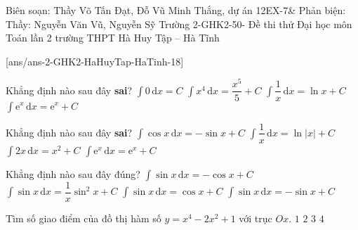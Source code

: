 
\begin{name}
{Biên soạn: Thầy Võ Tấn Đạt, Đỗ Vũ Minh Thắng, dự án 12EX-7\& Phản biện: Thầy: Nguyễn Văn Vũ, Nguyễn Sỹ Trường }
{2-GHK2-50- Đề thi thử Đại học môn Toán lần 2 trường THPT Hà Huy Tập – Hà Tĩnh}
\end{name}
\setcounter{ex}{0}\setcounter{bt}{0}
[ans/ans-2-GHK2-HaHuyTap-HaTinh-18]
\begin{ex}%
	Khẳng định nào sau đây \textbf{sai}?
	\choice
	{ $ \displaystyle\int0\mathrm{\,d}x = C $ }
	{ $ \displaystyle\int x^4\mathrm{\,d}x = \dfrac{x^5}{5} + C  $ }
	{\True $ \displaystyle\int\dfrac{1}{x}\mathrm{\,d}x = \ln x + C  $ }
	{ $ \displaystyle\int \mathrm{e}^x\mathrm{\,d}x = \mathrm{e}^x+C $ }
\end{ex}
\begin{ex}%
	Khẳng định nào sau đây \textbf{sai}?
	\choice
	{\True $ \displaystyle\int\cos x\mathrm{\,d}x = -\sin x + C $ }
	{ $ \displaystyle\int\dfrac{1}{x}\mathrm{\,d}x = \ln |x| + C $ }
	{ $ \displaystyle\int2x\mathrm{\,d}x = x^2  +C  $ }
	{ $ \displaystyle\int\mathrm{e}^x\mathrm{\,d}x  = \mathrm{e}^x + C $ }
\end{ex}
\begin{ex}%
	Khẳng định nào sau đây đúng?
	\choice
	{\True $ \displaystyle\int\sin x\mathrm{\,d}x = -\cos x + C $ }
	{ $ \displaystyle\int\sin x\mathrm{\,d}x = \dfrac{1}{x}\sin^2 x + C $ }
	{ $ \displaystyle\int\sin x\mathrm{\,d}x = \cos x + C $ }
	{ $ \displaystyle\int\sin x\mathrm{\,d}x = -\sin x + C $ }
\end{ex}
\begin{ex}%
	Tìm số giao điểm của đồ thị hàm số $ y = x^4-2x^2+1 $ với trục $ Ox $.
	\choice
	{ $ 1 $ }
	{\True $ 2 $ }
	{ $ 3 $ }
	{ $ 4 $ }
\end{ex}
